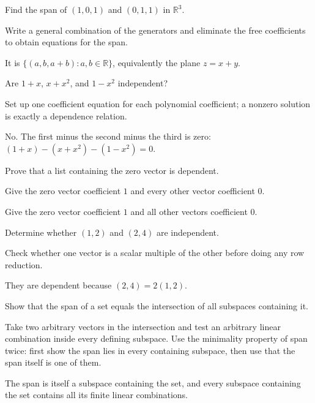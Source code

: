 \begin{exercise}\label{exr:i02-03}
Find the span of $(1,0,1)$ and $(0,1,1)$ in $\mathbb R^3$.
\end{exercise}
\begin{hint}
Write a general combination of the generators and eliminate the free coefficients to obtain equations for the span.
\end{hint}
\begin{solution}
It is $\{(a,b,a+b):a,b\in\mathbb R\}$, equivalently the plane $z=x+y$.
\end{solution}

\begin{exercise}\label{exr:i02-04}
Are $1+x$, $x+x^2$, and $1-x^2$ independent?
\end{exercise}
\begin{hint}
Set up one coefficient equation for each polynomial coefficient; a nonzero solution is exactly a dependence relation.
\end{hint}
\begin{solution}
No. The first minus the second minus the third is zero: $(1+x)-(x+x^2)-(1-x^2)=0$.
\end{solution}

\begin{exercise}\label{exr:i02-05}
Prove that a list containing the zero vector is dependent.
\end{exercise}
\begin{hint}
Give the zero vector coefficient \(1\) and every other vector coefficient \(0\).
\end{hint}
\begin{solution}
Give the zero vector coefficient $1$ and all other vectors coefficient $0$.
\end{solution}

\begin{exercise}\label{exr:i02-06}
Determine whether $(1,2)$ and $(2,4)$ are independent.
\end{exercise}
\begin{hint}
Check whether one vector is a scalar multiple of the other before doing any row reduction.
\end{hint}
\begin{solution}
They are dependent because $(2,4)=2(1,2)$.
\end{solution}

\begin{exercise}\label{exr:i02-07}
Show that the span of a set equals the intersection of all subspaces containing it.
\end{exercise}
\begin{hint}
Take two arbitrary vectors in the intersection and test an arbitrary linear combination inside every defining subspace. Use the minimality property of span twice: first show the span lies in every containing subspace, then use that the span itself is one of them.
\end{hint}
\begin{solution}
The span is itself a subspace containing the set, and every subspace containing the set contains all its finite linear combinations.
\end{solution}

